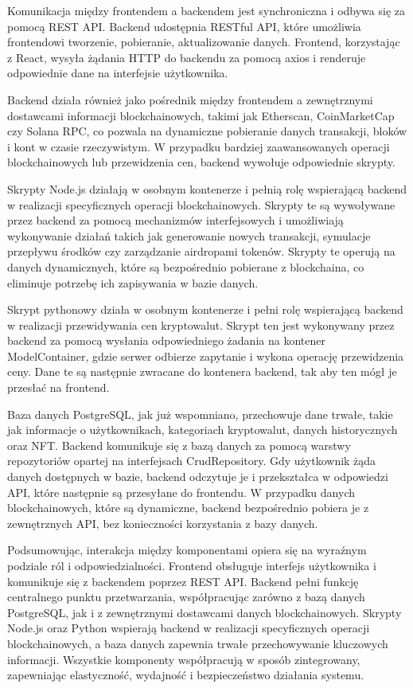 Komunikacja między frontendem a backendem jest synchroniczna i odbywa się za pomocą REST API. Backend udostępnia RESTful API, które umożliwia frontendowi tworzenie, pobieranie, aktualizowanie danych. Frontend, korzystając z React, wysyła żądania HTTP do backendu za pomocą axios i renderuje odpowiednie dane na interfejsie użytkownika.

Backend działa również jako pośrednik między frontendem a zewnętrznymi dostawcami informacji blockchainowych, takimi jak Etherscan, CoinMarketCap czy Solana RPC, co pozwala na dynamiczne pobieranie danych transakcji, bloków i kont w czasie rzeczywistym. W przypadku bardziej zaawansowanych operacji blockchainowych lub przewidzenia cen, backend wywołuje odpowiednie skrypty. %

Skrypty Node.js działają w osobnym kontenerze i pełnią rolę wspierającą backend w realizacji specyficznych operacji blockchainowych. Skrypty te są wywoływane przez backend za pomocą mechanizmów interfejsowych i umożliwiają wykonywanie działań takich jak generowanie nowych transakcji, symulacje przepływu środków czy zarządzanie airdropami tokenów. Skrypty te operują na danych dynamicznych, które są bezpośrednio pobierane z blockchaina, co eliminuje potrzebę ich zapisywania w bazie danych.

Skrypt pythonowy działa w osobnym kontenerze i pełni rolę wspierającą backend w realizacji przewidywania cen kryptowalut. Skrypt ten jest wykonywany przez backend za pomocą wysłania odpowiedniego żadania na kontener ModelContainer, gdzie serwer odbierze zapytanie i wykona operację przewidzenia ceny. Dane te są następnie zwracane do kontenera backend, tak aby ten mógł je przesłać na frontend.

Baza danych PostgreSQL, jak już wspomniano, przechowuje dane trwałe, takie jak informacje o użytkownikach, kategoriach kryptowalut, danych historycznych oraz NFT. Backend komunikuje się z bazą danych za pomocą warstwy repozytoriów opartej na interfejsach CrudRepository. Gdy użytkownik żąda danych dostępnych w bazie, backend odczytuje je i przekształca w odpowiedzi API, które następnie są przesyłane do frontendu. W przypadku danych blockchainowych, które są dynamiczne, backend bezpośrednio pobiera je z zewnętrznych API, bez konieczności korzystania z bazy danych.

Podsumowując, interakcja między komponentami opiera się na wyraźnym podziale ról i odpowiedzialności. Frontend obsługuje interfejs użytkownika i komunikuje się z backendem poprzez REST API. Backend pełni funkcję centralnego punktu przetwarzania, współpracując zarówno z bazą danych PostgreSQL, jak i z zewnętrznymi dostawcami danych blockchainowych. Skrypty Node.js oraz Python wspierają backend w realizacji specyficznych operacji blockchainowych, a baza danych zapewnia trwałe przechowywanie kluczowych informacji. Wszystkie komponenty współpracują w sposób zintegrowany, zapewniając elastyczność, wydajność i bezpieczeństwo działania systemu.


